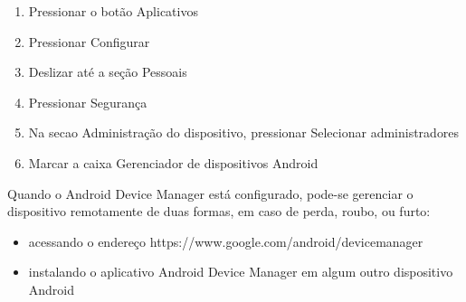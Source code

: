 \begin{enumerate}
\item Pressionar o bot\~ao Aplicativos
\item Pressionar Configurar
\item Deslizar at\'e a se\c c\~ao Pessoais
\item Pressionar Seguran\c ca
\item Na secao Administra\c c\~ao do dispositivo, pressionar Selecionar administradores
\item Marcar a caixa Gerenciador de dispositivos Android
\end{enumerate}

Quando o Android Device Manager est\'a configurado, pode-se gerenciar o dispositivo remotamente de duas formas, em caso de perda, roubo, ou furto: 

\begin{itemize}
\item acessando o endere\c co https://www.google.com/android/devicemanager
\item instalando o aplicativo Android Device Manager em algum outro dispositivo Android
\end{itemize}
